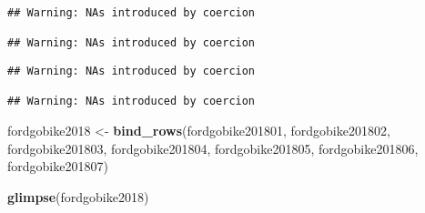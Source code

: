 \documentclass[]{article}
\newenvironment{Shaded}{\begin{snugshade}}{\end{snugshade}}
\newcommand{\DataTypeTok}[1]{\textcolor[rgb]{0.13,0.29,0.53}{#1}}
\newcommand{\KeywordTok}[1]{\textcolor[rgb]{0.13,0.29,0.53}{\textbf{#1}}}
\newcommand{\NormalTok}[1]{#1}
\newcommand{\OperatorTok}[1]{\textcolor[rgb]{0.81,0.36,0.00}{\textbf{#1}}}
\newcommand{\StringTok}[1]{\textcolor[rgb]{0.31,0.60,0.02}{#1}}
\begin{document}
\begin{Shaded}
\end{Shaded}

\begin{verbatim}
## Warning: NAs introduced by coercion

## Warning: NAs introduced by coercion
\end{verbatim}

\begin{Shaded}
\end{Shaded}

\begin{verbatim}
## Warning: NAs introduced by coercion

## Warning: NAs introduced by coercion
\end{verbatim}

\begin{Shaded}
\begin{Highlighting}[]
\NormalTok{fordgobike2018 <-}\StringTok{ }\KeywordTok{bind_rows}\NormalTok{(fordgobike201801, fordgobike201802, fordgobike201803, fordgobike201804,}
\NormalTok{                            fordgobike201805, fordgobike201806, fordgobike201807)}

\KeywordTok{glimpse}\NormalTok{(fordgobike2018)}
\end{Highlighting}
\end{Shaded}
\end{document}
